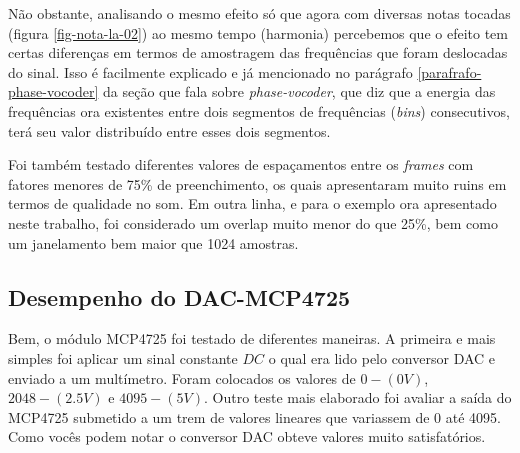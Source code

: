				Não obstante, analisando o mesmo efeito só que agora com diversas notas tocadas (figura \ref{fig-nota-la-02}) ao mesmo tempo (harmonia) percebemos que o efeito tem certas diferenças em termos de amostragem das frequências que foram deslocadas do sinal. Isso é facilmente explicado e já mencionado no parágrafo \ref{parafrafo-phase-vocoder} da seção que fala sobre \textit{phase-vocoder}, que diz que a energia das frequências ora existentes entre dois segmentos de frequências (\textit{bins}) consecutivos, terá seu valor distribuído entre esses dois segmentos.
				
				Foi também testado diferentes valores de espaçamentos entre os \textit{frames} com fatores menores de 75\% de preenchimento, os quais apresentaram muito ruins em termos de qualidade no som. Em outra linha, e para o exemplo ora apresentado neste trabalho, foi considerado um overlap muito menor do que 25\%, bem como um janelamento bem maior que 1024 amostras.
				
			
			\subsection{Desempenho do DAC-MCP4725}
				 
				 Bem, o módulo MCP4725 foi testado de diferentes maneiras. A primeira e mais simples foi aplicar um sinal constante $ DC $ o qual era lido pelo conversor DAC e enviado a um multímetro. Foram colocados os valores de $ 0 - (0V) $, $ 2048 - (2.5V) $ e $ 4095 - (5V) $.
				 Outro teste mais elaborado foi avaliar a saída do MCP4725 submetido a um trem de valores lineares que variassem de 0 até 4095. Como vocês podem notar o conversor DAC obteve valores muito satisfatórios.
				 

